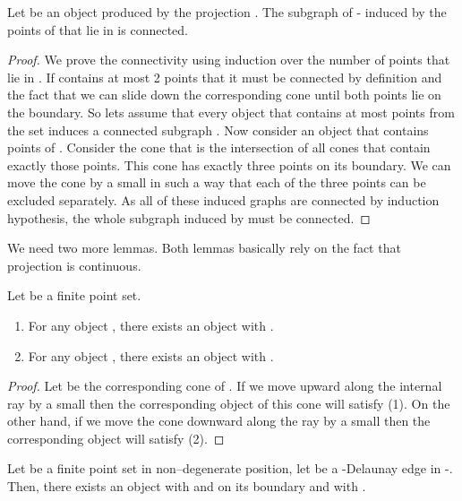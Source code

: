 \documentclass{stacs_proc}
\begin{document}
\begin{lemma}
  \label{lem:connect}
  Let  be an object produced by the projection . The subgraph
   of - induced by the points of  that lie in  is
  connected. 
\end{lemma}

\begin{proof}
  We prove the connectivity using induction over the number of points
  that lie in . 
  If  contains at most 2 points that it must be connected by
  definition and the fact that we can slide down the corresponding
  cone until both points lie on the boundary. So lets assume that
  every object  that contains at most  points from the set 
  induces a connected subgraph . Now consider an object  that
  contains  points of . Consider the cone that is the
  intersection of all cones that contain  exactly those 
  points. This cone has exactly three points on its boundary. We can
  move the cone by a small  in such a way that each of the three
  points can be excluded separately. As all of these induced graphs
  are connected by induction hypothesis, the whole subgraph induced by
   must be connected.    
\end{proof}

We need two more lemmas. Both lemmas basically rely on the fact that
projection  is continuous. 
\begin{lemma}
  \label{lem:cont}
  Let  be a finite point set.
  \begin{enumerate}
  \item For any object , there exists an object  with
    .
  \item For any object , there exists an object  with
    .   
  \end{enumerate}
\end{lemma}

\begin{proof}
  Let  be the corresponding cone of . If we move  upward
  along the internal ray  by a small  then the corresponding
  object  of this cone will satisfy (1). On the other hand, if we
  move the cone  downward along the ray  by a small  then the
  corresponding object  will satisfy (2).  
\end{proof}


\begin{lemma}
  \label{lem:dedge}
  Let  be a finite point set in non--degenerate position, let
   be a -Delaunay edge in -. Then, there exists
  an object  with  and  on its boundary and with .  
\end{lemma}
\end{document}
